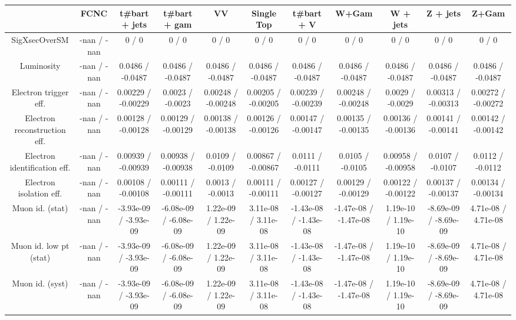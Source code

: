 \begin{table}[htbp]
\begin{center}
\footnotesize
\begin{tabular}{|c|c|c|c|c|c|c|c|c|c|c|}
\hline 
      & FCNC      & t#bar{t} + jets      & t#bar{t} +  gam      & VV      & Single Top      & t#bar{t} + V      & W+Gam      & W + jets      & Z + jets      & Z+Gam \\ 
\hline 
 SigXsecOverSM & -nan / -nan & 0 / 0 & 0 / 0 & 0 / 0 & 0 / 0 & 0 / 0 & 0 / 0 & 0 / 0 & 0 / 0 & 0 / 0 \\ 
  Luminosity & -nan / -nan & 0.0486 / -0.0487 & 0.0486 / -0.0487 & 0.0486 / -0.0487 & 0.0486 / -0.0487 & 0.0486 / -0.0487 & 0.0486 / -0.0487 & 0.0486 / -0.0487 & 0.0486 / -0.0487 & 0.0486 / -0.0487 \\ 
  Electron trigger eff. & -nan / -nan & 0.00229 / -0.00229 & 0.0023 / -0.0023 & 0.00248 / -0.00248 & 0.00205 / -0.00205 & 0.00239 / -0.00239 & 0.00248 / -0.00248 & 0.0029 / -0.0029 & 0.00313 / -0.00313 & 0.00272 / -0.00272 \\ 
  Electron reconstruction eff. & -nan / -nan & 0.00128 / -0.00128 & 0.00129 / -0.00129 & 0.00138 / -0.00138 & 0.00126 / -0.00126 & 0.00147 / -0.00147 & 0.00135 / -0.00135 & 0.00136 / -0.00136 & 0.00141 / -0.00141 & 0.00142 / -0.00142 \\ 
  Electron identification eff. & -nan / -nan & 0.00939 / -0.00939 & 0.00938 / -0.00938 & 0.0109 / -0.0109 & 0.00867 / -0.00867 & 0.0111 / -0.0111 & 0.0105 / -0.0105 & 0.00958 / -0.00958 & 0.0107 / -0.0107 & 0.0112 / -0.0112 \\ 
  Electron isolation eff. & -nan / -nan & 0.00108 / -0.00108 & 0.00111 / -0.00111 & 0.0013 / -0.0013 & 0.00111 / -0.00111 & 0.00127 / -0.00127 & 0.00129 / -0.00129 & 0.00122 / -0.00122 & 0.00137 / -0.00137 & 0.00134 / -0.00134 \\ 
  Muon id. (stat) & -nan / -nan & -3.93e-09 / -3.93e-09 & -6.08e-09 / -6.08e-09 & 1.22e-09 / 1.22e-09 & 3.11e-08 / 3.11e-08 & -1.43e-08 / -1.43e-08 & -1.47e-08 / -1.47e-08 & 1.19e-10 / 1.19e-10 & -8.69e-09 / -8.69e-09 & 4.71e-08 / 4.71e-08 \\ 
  Muon id. low pt (stat) & -nan / -nan & -3.93e-09 / -3.93e-09 & -6.08e-09 / -6.08e-09 & 1.22e-09 / 1.22e-09 & 3.11e-08 / 3.11e-08 & -1.43e-08 / -1.43e-08 & -1.47e-08 / -1.47e-08 & 1.19e-10 / 1.19e-10 & -8.69e-09 / -8.69e-09 & 4.71e-08 / 4.71e-08 \\ 
  Muon id. (syst) & -nan / -nan & -3.93e-09 / -3.93e-09 & -6.08e-09 / -6.08e-09 & 1.22e-09 / 1.22e-09 & 3.11e-08 / 3.11e-08 & -1.43e-08 / -1.43e-08 & -1.47e-08 / -1.47e-08 & 1.19e-10 / 1.19e-10 & -8.69e-09 / -8.69e-09 & 4.71e-08 / 4.71e-08 \\ 

\end{tabular}
\end{center}
\end{table}
